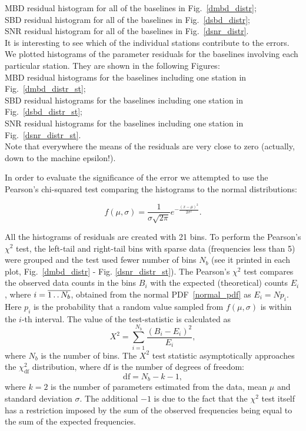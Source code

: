 \documentclass[letterpaper,twoside,12pt]{article}
\newcommand{\twodots}{\mathinner {\ldotp \ldotp}}
\begin{document}
\indent MBD residual histogram for all of the baselines in Fig.~\ref{dmbd_distr};  \\
\indent SBD residual histogram for all of the baselines in Fig.~\ref{dsbd_distr};  \\
\indent SNR residual histogram for all of the baselines in Fig.~\ref{dsnr_distr}.  \\

It is interesting to see which of the individual stations contribute to the errors. We plotted histograms of the parameter residuals for the baselines involving each particular station. They are shown in the following Figures: \\

\indent MBD residual histograms for the baselines including one station in Fig.~\ref{dmbd_distr_st};  \\
\indent SBD residual histograms for the baselines including one station in Fig.~\ref{dsbd_distr_st};  \\
\indent SNR residual histograms for the baselines including one station in Fig.~\ref{dsnr_distr_st}.  \\

Note that everywhere the means of the residuals are very close to zero (actually, down to the machine epsilon!). 

In order to evaluate the significance of the error we attempted to use the Pearson's chi-squared test comparing the histograms to the normal distributions:

\begin{equation}
  \label{normal_pdf}
  f(\mu,\sigma) =  \frac{1}{\sigma\sqrt{2\pi}} e^{-\frac{(x-\mu)^2}{2\sigma^2}}.
\end{equation}

All the histograms of residuals are created with 21 bins. To perform the Pearson's $\chi^2$ test, the left-tail and right-tail bins with sparse data (frequencies less than 5) were grouped and the test used fewer number of bins $N_b$ (see it printed in each plot, Fig.~\ref{dmbd_distr} - Fig. \ref{dsnr_distr_st}). The Pearson's $\chi^2$ test compares the observed data counts in the bins $B_i$ with the expected (theoretical) counts $E_i$, where $i=\overline{1 \twodots N_b}$, obtained from the normal PDF~\eqref{normal_pdf} as $E_i = Np_i$. Here $p_i$ is the probability that a random value sampled from $f(\mu,\sigma)$ is within the $i$-th interval. The value of the test-statistic is calculated as
\begin{equation}
  \label{x2_calc}
  X^2 = \sum_{i=1}^{N_b} \frac{(B_i - E_i)^2}{E_i},
\end{equation}
where $N_b$ is the number of bins.
The $X^2$ test statistic asymptotically approaches the $\chi^2_\mathrm{df}$ distribution, where $\mathrm{df}$ is the number of degrees of freedom:
\begin{equation}
  \label{df}
  \mathrm{df} = N_b - k - 1,
\end{equation}
where $k=2$ is the number of parameters estimated from the data, mean $\mu$ and standard deviation $\sigma$. The additional $-1$ is due to the fact that the $\chi^2$ test itself has a restriction imposed by the sum of the observed frequencies being equal to the sum of the expected frequencies.
\end{document}
